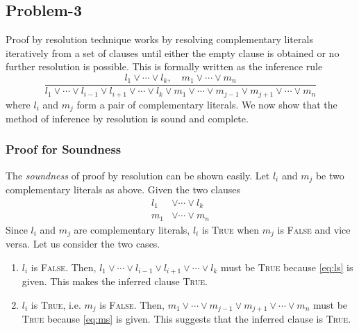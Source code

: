 \documentclass[12pt]{article}
\begin{document}
    \subsection*{Problem-3}
    Proof by resolution technique works by resolving complementary literals iteratively from a set
    of clauses until either the empty clause is obtained or no further resolution is possible.
    This is formally written as the inference rule
    $$\frac
    {l_{1} \vee \cdots \vee l_{k}, \quad m_{1} \vee \cdots \vee m_{n}}
    {l_{1} \vee \cdots \vee l_{i-1} \vee l_{i+1} \vee \cdots \vee l_{k} \vee m_{1} \vee \cdots
    \vee m_{j-1} \vee m_{j+1} \vee \cdots \vee m_{n}}$$
    where $l_{i}$ and $m_{j}$ form a pair of complementary literals. We now show that the method of
    inference by resolution is sound and complete.

    \subsubsection*{Proof for Soundness}
    The \textit{soundness} of proof by resolution can be shown easily. Let $l_{i}$ and $m_{j}$ be
    two complementary literals as above. Given the two clauses
    \begin{align}
        \label{eq:ls}
        l_{1} &\vee \cdots \vee l_{k} \\
        \label{eq:ms}
        m_{1} &\vee \cdots \vee m_{n}
    \end{align}
    Since $l_{i}$ and $m_{j}$ are complementary literals, $l_{i}$ is \textsc{True} when $m_{j}$ is \textsc{False} and
    vice versa. Let us consider the two cases.
    \begin{enumerate}
        \item
        $l_{i}$ is \textsc{False}. Then, $l_{1} \vee \cdots \vee l_{i-1} \vee l_{i+1} \vee \cdots \vee l_{k}$ must be
        \textsc{True} because \eqref{eq:ls} is given. This makes the inferred clause \textsc{True}.
        \item
        $l_{i}$ is \textsc{True}, i.e. $m_{j}$ is \textsc{False}. Then,
        $m_{1} \vee \cdots \vee m_{j-1} \vee m_{j+1} \vee \cdots \vee m_{n}$ must be \textsc{True} because \eqref{eq:ms}
        is given. This suggests that the inferred clause is \textsc{True}.
    \end{enumerate}
\end{document}
